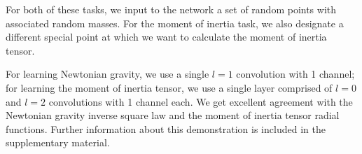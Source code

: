 \documentclass{article}
\begin{document}
For both of these tasks, we input to the network a set of random points with associated random masses. %
For the moment of inertia task, we also designate a different special point at which we want to calculate the moment of inertia tensor. 

For learning Newtonian gravity, we use a single $l=1$ convolution with 1 channel; for learning the moment of inertia tensor, we use a single layer comprised of $l=0$ and $l=2$ convolutions with 1 channel each. %
We get excellent agreement with the Newtonian gravity inverse square law %
and %
the moment of inertia tensor radial functions. %
Further information about this demonstration is included in the supplementary material.  %

\end{document}
